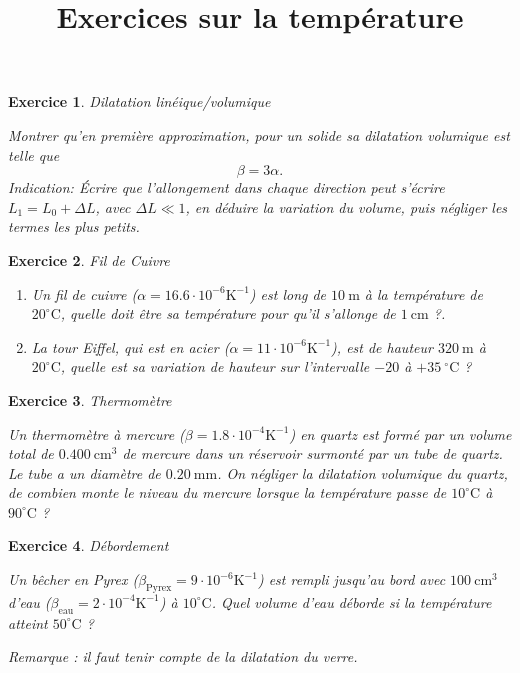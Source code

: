 \documentclass[a4paper,12pt]{article}
\title{Exercices sur la température}
\date{}
\newtheorem{exercice}{Exercice}
\newcommand{\cm}{\mathrm{cm}}
\newcommand{\mm}{\mathrm{mm}}
\newcommand{\m}{\mathrm{m}}
\newcommand{\K}{\mathrm{K}}
\newcommand{\C}{\mathrm{C}}
\newcommand{\oC}{^\circ\C}
\begin{document}
\maketitle

\begin{exercice}{Dilatation linéique/volumique}

Montrer qu’en première approximation, pour un solide sa dilatation volumique est telle que 
\begin{equation}
\beta=3\alpha.
\end{equation}
Indication: Écrire que l'allongement dans chaque direction peut s'écrire $L_1=L_0+\Delta L$, avec $\Delta L\ll 1$,
en déduire la variation
du volume, puis négliger les termes les plus petits.
\end{exercice}

\begin{exercice}{Fil de Cuivre}

\begin{enumerate}
	\item Un fil de cuivre ($\alpha=16.6\cdot 10^{-6}\K^{-1}$) est long de $10\ \m$ à la température de $20\oC$, quelle doit être sa
température pour qu'il s'allonge de $1\ \cm$ ?.
	\item La tour Eiffel, qui est en acier ($\alpha=11\cdot 10^{-6}\K^{-1}$), est de hauteur $320\ \m$ à $20\oC$, quelle est sa variation de hauteur
sur l’intervalle $-20$ à $+35\ \oC$ ?
\end{enumerate}
\end{exercice}

\begin{exercice}{Thermomètre}

Un thermomètre à mercure ($\beta=1.8\cdot 10^{-4}\K^{-1}$) en quartz est formé par un volume total de $0.400\ \cm^3$ de mercure
dans un réservoir surmonté par un tube de quartz. Le tube a un diamètre de $0.20\ \mm$.
On négliger la dilatation volumique du quartz, de combien monte le niveau du mercure
lorsque la température passe de $10\oC$ à $90\oC$ ?
\end{exercice}

\begin{exercice}{Débordement}

Un bêcher en Pyrex ($\beta_\mathrm{Pyrex}=9\cdot10^{-6}\K^{-1}$) est rempli jusqu'au bord avec $100\ \cm^3$ d'eau ($\beta_\mathrm{eau}=2\cdot10^{-4}\K^{-1}$) à $10\oC$.
Quel volume d'eau déborde si la température atteint $50\oC$ ?

Remarque : il faut tenir compte de la dilatation du verre.
\end{exercice}
\end{document}
